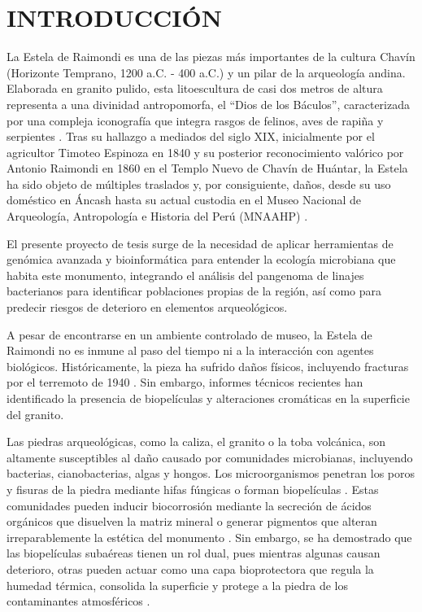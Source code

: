 \chapter{INTRODUCCIÓN} 


La Estela de Raimondi es una de las piezas más importantes de la cultura Chavín (Horizonte Temprano, 1200 a.C. - 400 a.C.) y un pilar de la arqueología andina. Elaborada en granito pulido, esta litoescultura de casi dos metros de altura representa a una divinidad antropomorfa, el ``Dios de los Báculos'', caracterizada por una compleja iconografía que integra rasgos de felinos, aves de rapiña y serpientes \cite{cordycollins1993}. Tras su hallazgo a mediados del siglo XIX, inicialmente por el agricultor Timoteo Espinoza en 1840 y su posterior reconocimiento valórico por Antonio Raimondi en 1860 en el Templo Nuevo de Chavín de Huántar, la Estela ha sido objeto de múltiples traslados y, por consiguiente, daños, desde su uso doméstico en Áncash hasta su actual custodia en el Museo Nacional de Arqueología, Antropología e Historia del Perú (MNAAHP) \cite{hernandez2012}.

El presente proyecto de tesis surge de la necesidad de aplicar herramientas de genómica avanzada y bioinformática para entender la ecología microbiana que habita este monumento, integrando el análisis del pangenoma de linajes bacterianos para identificar poblaciones propias de la región, así como para predecir riesgos de deterioro en elementos arqueológicos.


A pesar de encontrarse en un ambiente controlado de museo, la Estela de Raimondi no es inmune al paso del tiempo ni a la interacción con agentes biológicos. Históricamente, la pieza ha sufrido daños físicos, incluyendo fracturas por el terremoto de 1940 \cite{mnaahp2015}. Sin embargo, informes técnicos recientes han identificado la presencia de biopelículas y alteraciones cromáticas en la superficie del granito.

Las piedras arqueológicas, como la caliza, el granito o la toba volcánica, son altamente susceptibles al daño causado por comunidades microbianas, incluyendo bacterias, cianobacterias, algas y hongos. Los microorganismos penetran los poros y fisuras de la piedra mediante hifas fúngicas o forman biopelículas \cite{dakal2012}. Estas comunidades pueden inducir biocorrosión mediante la secreción de ácidos orgánicos que disuelven la matriz mineral o generar pigmentos que alteran irreparablemente la estética del monumento \cite{dakal2012,villa2016}. Sin embargo, se ha demostrado que las biopelículas subaéreas tienen un rol dual, pues mientras algunas causan deterioro, otras pueden actuar como una capa bioprotectora que regula la humedad térmica, consolida la superficie y protege a la piedra de los contaminantes atmosféricos \cite{villa2016,alonso2025}.

